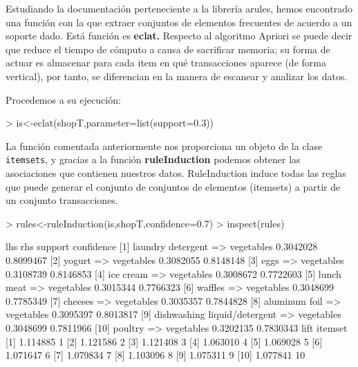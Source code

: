 \documentclass [a4paper] {article}
\begin{document}
{\bigskip
Estudiando la documentación perteneciente a la librería arules, hemos encontrado una función con la que extraer
conjuntos de elementos frecuentes de acuerdo a un soporte dado. Está función es \textbf{eclat.}
Respecto al algoritmo Apriori se puede decir que reduce el tiempo de cómputo a causa de sacrificar memoria; su
forma de actuar es almacenar para cada item en qué transacciones aparece (de forma vertical), por tanto, 
se diferencian en la manera de escanear y analizar los datos.

\bigskip
Procedemos a su ejecución:
\begin{Schunk}
\begin{Sinput}
> is<-eclat(shopT,parameter=list(support=0.3))
\end{Sinput}
\end{Schunk}

\bigskip
La función comentada anteriormente nos proporciona un objeto de la clase \texttt{itemsets}, y gracias a la función
\textbf{ruleInduction} podemos obtener las asociaciones que contienen nuestros datos. RuleInduction induce todas las reglas 
que puede generar el conjunto de conjuntos de elementos (itemsets) a partir de un conjunto transacciones.
\begin{Schunk}
\begin{Sinput}
> rules<-ruleInduction(is,shopT,confidence=0.7)
> inspect(rules)
\end{Sinput}
\begin{Soutput}
     lhs                               rhs          support   confidence
[1]  {laundry detergent}            => {vegetables} 0.3042028 0.8099467 
[2]  {yogurt}                       => {vegetables} 0.3082055 0.8148148 
[3]  {eggs}                         => {vegetables} 0.3108739 0.8146853 
[4]  {ice cream}                    => {vegetables} 0.3008672 0.7722603 
[5]  {lunch meat}                   => {vegetables} 0.3015344 0.7766323 
[6]  {waffles}                      => {vegetables} 0.3048699 0.7785349 
[7]  {cheeses}                      => {vegetables} 0.3035357 0.7844828 
[8]  {aluminum foil}                => {vegetables} 0.3095397 0.8013817 
[9]  {dishwashing liquid/detergent} => {vegetables} 0.3048699 0.7811966 
[10] {poultry}                      => {vegetables} 0.3202135 0.7830343 
     lift     itemset
[1]  1.114885  1     
[2]  1.121586  2     
[3]  1.121408  3     
[4]  1.063010  4     
[5]  1.069028  5     
[6]  1.071647  6     
[7]  1.079834  7     
[8]  1.103096  8     
[9]  1.075311  9     
[10] 1.077841 10     
\end{Soutput}
\end{Schunk}

}
\end{document}
